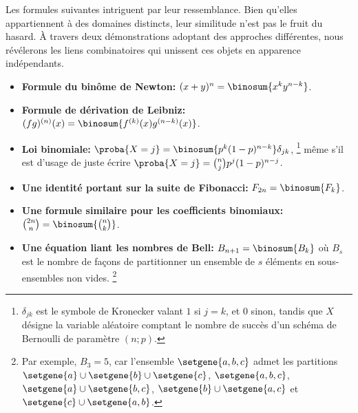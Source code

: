Les formules suivantes intriguent par leur ressemblance. Bien qu'elles appartiennent à des domaines distincts, leur similitude n’est pas le fruit du hasard. À travers deux démonstrations adoptant des approches différentes, nous révélerons les liens combinatoires qui unissent ces objets en apparence indépendants.
%
\begin{itemize}
    \item \textbf{Formule du binôme de Newton:}
    $(x + y)^n = \binosum{x^k y^{n-k}}$.


    \item \textbf{Formule de dérivation de Leibniz:}
    $(fg)^{(n)}(x) = \binosum{f^{(k)}(x) g^{(n-k)}(x)}$.


    \item \textbf{Loi binomiale:}
    $\proba{X = j} = \binosum{p^k (1 - p)^{n-k}} \delta_{jk}$,%
    \footnote{
    	$\delta_{jk}$ est le symbole de Kronecker valant $1$ si $j=k$, et $0$ sinon,
		tandis que
		$X$ désigne la variable aléatoire comptant le nombre de succès d'un schéma de Bernoulli de paramètre $(n ; p)$.
    }
    même s'il est d'usage de juste écrire
    $\proba{X = j} =\binom{n}{j} p^j (1 - p)^{n-j}$.


    \item \textbf{Une identité portant sur la suite de Fibonacci:}
    $F_{2n} = \binosum{F_k}$.


    \item \textbf{Une formule similaire pour les coefficients binomiaux:}
    $\binom{2n}{n} = \binosum{\binom{n}{k}}$.


    \item \textbf{Une équation liant les nombres de Bell:}
    $B_{n+1} = \binosum{B_k}$ où $B_s$ est le nombre de façons de partitionner un ensemble de $s$ éléments en sous-ensembles non vides.%
    \footnote{
    	Par exemple,
    	$B_3 = 5$,
    	car l'ensemble $\setgene{ a , b , c }$ admet les partitions
    	$\setgene{ a } \cup \setgene{ b } \cup \setgene{ c }$,
    	$\setgene{ a , b , c }$,
    	$\setgene{ a } \cup \setgene{ b , c }$,
    	$\setgene{ b } \cup \setgene{ a , c }$ et
    	$\setgene{ c } \cup \setgene{ a , b }$.
	}
\end{itemize}